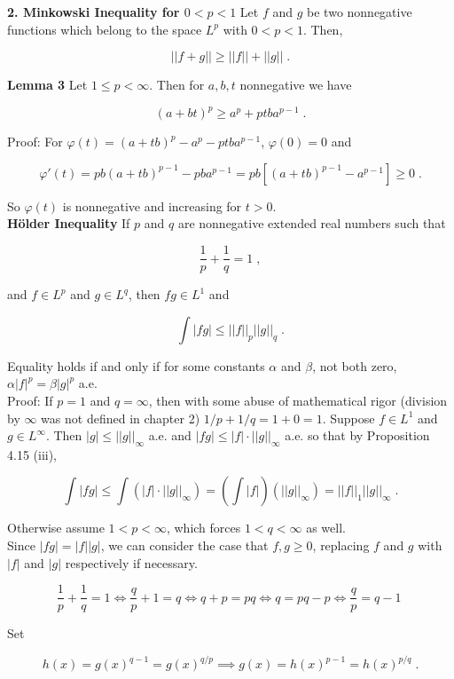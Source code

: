 \documentclass[a4paper]{article}
\begin{document}
{\bf 2. Minkowski Inequality for $0<p <1$ } Let $f$ and $g$ be two nonnegative functions which belong to the space $L^p$ with $0 < p < 1$. Then,

$$||f+g|| \geq ||f|| + ||g|| \;.$$

{\bf Lemma 3} Let $1 \leq p < \infty$. Then for $a,b,t$ nonnegative we have 

$$(a+bt)^p \geq a^p + ptba^{p-1} \;.$$

Proof: For $\varphi(t) = (a+tb)^p - a^p -ptba^{p-1}$, $\varphi(0) = 0$ and

$$\varphi'(t) = pb(a+tb)^{p-1} - pba^{p-1} = pb[(a+tb)^{p-1} - a^{p-1}] \geq 0 \;.$$

So $\varphi(t)$ is nonnegative and increasing for $t >0$.\\

{\bf Hölder Inequality} If $p$ and $q$ are nonnegative extended real numbers such that

$$\frac{1}{p} + \frac{1}{q} = 1 \;,$$

and $f\in L^p$ and $g \in L^q$, then $fg \in L^1$ and

$$\int |fg| \leq ||f||_p ||g||_q \;.$$

Equality holds if and only if for some constants $\alpha$ and $\beta$, not both zero, $\alpha |f|^p = \beta |g|^p$ a.e.\\

Proof: If $p = 1$ and $q = \infty$, then with some abuse of mathematical rigor (division by $\infty$ was not defined in chapter 2) $1/p + 1/q = 1 + 0 = 1$. Suppose $f \in L^1$ and $g \in L^\infty$. Then $|g| \leq ||g||_\infty$ a.e. and $|fg| \leq |f| \cdot ||g||_\infty$ a.e. so that by Proposition 4.15 (iii),

$$\int |fg| \leq \int \left(|f|\cdot ||g||_\infty\right) = \left(\int |f|\right)(||g||_\infty) = ||f||_1 ||g||_\infty \;.$$

Otherwise assume $1< p < \infty$, which forces $1< q < \infty$ as well. \\

Since $|fg| = |f||g|$, we can consider the case that $f,g\geq 0$, replacing $f$ and $g$ with $|f|$ and $|g|$ respectively if necessary. 

$$\frac{1}{p}+ \frac{1}{q} = 1 \iff \frac{q}{p} + 1 = q \iff q+p = pq \iff q = pq - p \iff \frac{q}{p} = q - 1 \;$$

 Set

$$h(x) = g(x)^{q-1}  = g(x)^{q/p}  \implies g(x) = h(x)^{p-1} =h(x)^{p/q} \;.$$
\end{document}
